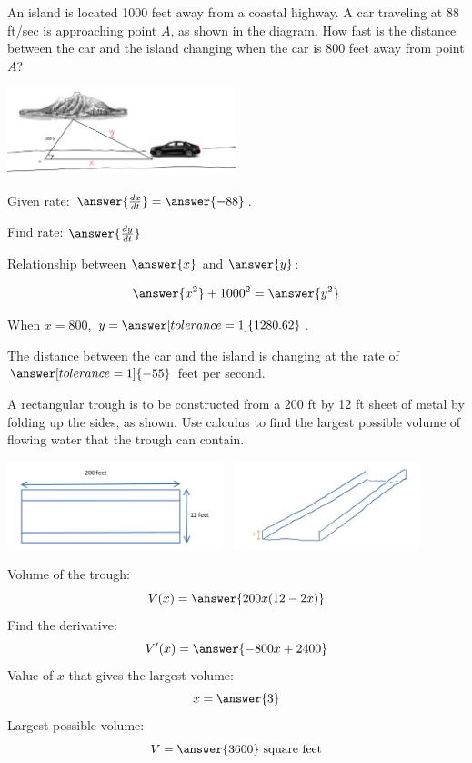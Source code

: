 \documentclass{ximera}
\begin{document}
\begin{problem}\label{prob:mth240exam2prob2}
An island is located 1000 feet away from a coastal highway.  A car traveling at 88 ft/sec is approaching point $A$, as shown in the diagram.  How fast is the distance between the car and the island changing when the car is 800 feet away from point $A$?
\begin{image}
   
\includegraphics[height=1in]{Inkedtest2image4.jpg}~
 
\end{image}

Given rate: $\answer{\frac{dx}{dt}}=\answer{-88}$.

Find rate:  $\answer{\frac{dy}{dt}}$

Relationship between $\answer{x}$ and $\answer{y}$:

$$\answer{x^2}+1000^2=\answer{y^2}$$

When $x=800$, $y=\answer[tolerance=1]{1280.62}$.

The distance between the car and the island is changing at the rate of $\answer[tolerance=1]{-55}$ feet per second.
\end{problem}

\begin{problem}\label{prob:mth240exam2prob3}
A rectangular trough is to be constructed from a 200 ft by 12 ft sheet of metal by folding up the sides, as shown.  Use calculus to find the largest possible volume of flowing water that the trough can contain.

\begin{image}
   
\includegraphics[height=1in]{test2image2.jpg}~
\includegraphics[height=1in]{Inkedtest2image3.jpg}~
 
\end{image}
Volume of the trough:
$$V(x)=\answer{200x(12-2x)}$$
Find the derivative:
$$V'(x)=\answer{-800x+2400}$$
Value of $x$ that gives the largest volume:
$$x=\answer{3}$$
Largest possible volume:
$$V=\answer{3600}\mbox{ square feet}$$

\end{problem}
\end{document}
